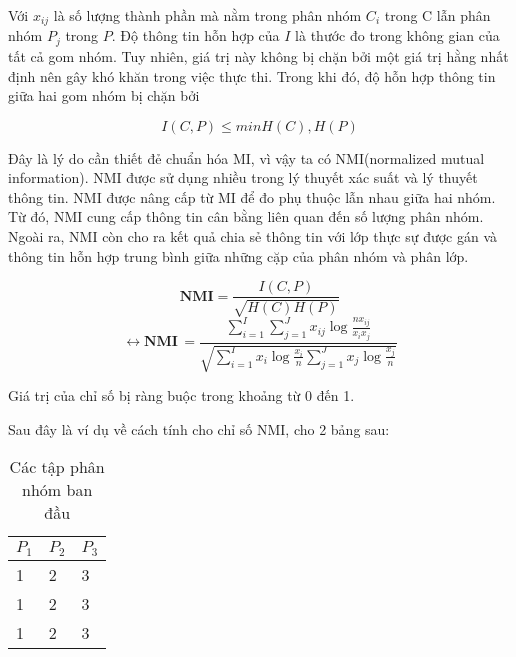 Với $x_{ij}$ là số lượng thành phần mà nằm trong phân nhóm $C_i$ trong C lẫn phân nhóm $P_j$ trong $P$.
Độ thông tin hỗn hợp của $I$ là thước đo trong không gian của tất cả gom nhóm.
Tuy nhiên, giá trị này không bị chặn bởi một giá trị hằng nhất định nên gây khó khăn trong việc thực thi. Trong khi đó, độ hỗn hợp thông tin giữa hai gom nhóm bị chặn bởi 
\begin{center}
\begin{equation}
I (C, P) \leq min{H(C), H(P)}
\end{equation}
\end{center}

Đây là lý do cần thiết đẻ chuẩn hóa MI, vì vậy ta có NMI(normalized mutual information).
NMI được sử dụng nhiều trong lý thuyết xác suất và lý thuyết thông tin.
NMI được nâng cấp từ MI để đo phụ thuộc lẫn nhau giữa hai nhóm.
Từ đó, NMI cung cấp thông tin cân bằng liên quan đến số lượng phân nhóm.
Ngoài ra, NMI còn cho ra kết quả chia sẻ thông tin với lớp thực sự được gán và thông tin hỗn hợp trung bình giữa những cặp của phân nhóm và phân lớp.
		
\begin{center}
\begin{equation}
\textbf{NMI} = \frac{I(C,P)}{\sqrt{H(C)H(P)}}
\end{equation}
\begin{equation}
\longleftrightarrow \textbf{NMI} \, = \frac{\sum^I_{i=1} \sum^J_{j=1} x_{ij} \log \frac{n x_{ij}}{x_i x_j}}{\sqrt{\sum^I_{i=1} x_i \log \frac{x_i}{n} \sum^J_{j=1} x_j \log \frac{x_j}{n}}}
\end{equation}
\end{center}

Giá trị của chỉ số bị ràng buộc trong khoảng từ 0 đến 1.

Sau đây là ví dụ về cách tính cho chỉ số NMI, cho 2 bảng sau:
\begin{table}[ht]
\begin{center}
\begin{tabularx}{\textwidth}{|Y|Y|Y|}
\hline
$P_1$ & $P_2$ & $P_3$ \\
 & 2 & 3\\

1 & 2 & 3\\

1 & 2 & 3\\
\hline
\end{tabularx}
\caption[Các tập phân nhóm ban đầu]{Các tập phân nhóm ban đầu}
\label{bang_4_3}
\end{center}
\end{table}

